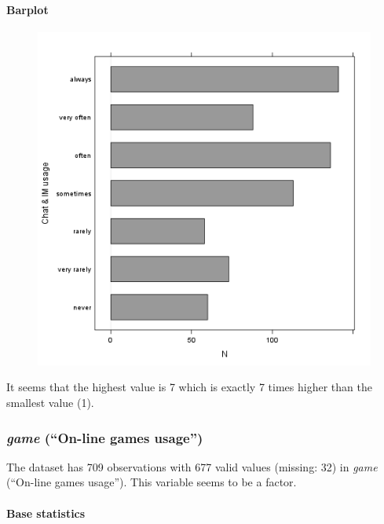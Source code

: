 \documentclass{article}
\makeatletter
\def\maxwidth{\ifdim\Gin@nat@width>\linewidth\linewidth
\else\Gin@nat@width\fi}
\let\Oldincludegraphics\includegraphics
\renewcommand{\includegraphics}[1]{\Oldincludegraphics[width=\maxwidth]{#1}}
\makeatother
\begin{document}
\paragraph{Barplot}

\begin{figure}[htbp]
\centering
\includegraphics{5a00abbe4c793ceedbbf10939665b5cf.png}
\caption{}
\end{figure}

It seems that the highest value is 7 which is exactly 7 times higher
than the smallest value (1).

\subsubsection{\emph{game} (``On-line games usage'')}

The dataset has 709 observations with 677 valid values (missing: 32) in
\emph{game} (``On-line games usage''). This variable seems to be a
factor.

\paragraph{Base statistics}
\end{document}
